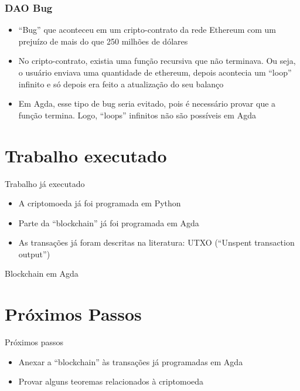 \documentclass{beamer}
\begin{document}
\begin{frame}
  \frametitle{DAO Bug}
  \begin{itemize}
    \item \foreignquote{english}{Bug} que aconteceu em um cripto-contrato da rede Ethereum com um prejuízo de mais do que 250 milhões de dólares
      \cite{wood2014ethereum}
    \item No cripto-contrato, existia uma função recursiva que não terminava. Ou seja, o usuário enviava uma quantidade de ethereum, depois acontecia um \foreignquote{english}{loop} infinito e só depois era feito a atualização do seu balanço
    \item Em Agda, esse tipo de bug seria evitado, pois é necessário provar que a função termina. Logo, \foreignquote{english}{loops} infinitos não são possíveis em Agda
  \end{itemize}
\end{frame}

\section{Trabalho executado}

\begin{frame}{Trabalho já executado}
  \begin{itemize}
    \item A criptomoeda já foi programada em Python
    \item Parte da \foreignquote{english}{blockchain} já foi programada em Agda
    \item As transações já foram descritas na literatura: UTXO (\foreignquote{english}{Unspent transaction output}) \\
      \cite{setzer2018modelling}
  \end{itemize}
\end{frame}

\begin{frame}{Blockchain em Agda}
  \begin{adjustwidth}{-3.5em}{-2em} \fontsize{8}{11}
  \end{adjustwidth}
\end{frame}
  
\section{Próximos Passos}

\begin{frame}{Próximos passos}
  \begin{itemize}
    \item Anexar a \foreignquote{english}{blockchain} às transações já programadas em Agda
    \item Provar alguns teoremas relacionados à criptomoeda
  \end{itemize}
\end{frame}
\end{document}
